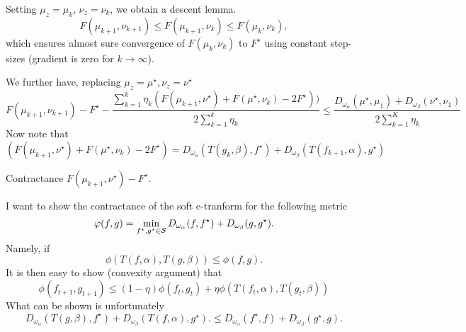 \documentclass[a4paper, 10pt]{article}
\begin{document}
Setting $\mu_z = \mu_{k}$, $\nu_z = \nu_k$, we obtain a descent lemma.
\begin{equation}
    F(\mu_{k+1}, \nu_{k+1}) \leq F(\mu_{k+1}, \nu_{k}) \leq F(\mu_{k}, \nu_{k}),
\end{equation}
which ensures almost sure convergence of $F(\mu_k, \nu_k)$ to $F^\star$ using constant step-sizes (gradient is zero for $k \to \infty$).

We further have, replacing $\mu_z = \mu^\star, \nu_z = \nu^\star$
%
\begin{equation}
    F(\mu_{k+1}, \nu_{k+1}) - F^\star
    - \frac{
        \sum_{k=1}^k \eta_k (F(\mu_{k+1}, \nu^\star)
    +F(\mu^\star, \nu_k) - 2 F^\star))
    }
    {2 \sum_{k=1}^k \eta_k}
    \leq \frac{
    D_{\omega_\alpha}(\mu^\star, \mu_1)
    + D_{\omega_\beta}(\nu^\star, \nu_1)
    }{2 \sum_{k=1}^K \eta_k}
\end{equation}
Now note that
\begin{equation}
    (F(\mu_{k+1}, \nu^\star)
    +F(\mu^\star, \nu_k) - 2 F^\star) =
     D_{\omega_\alpha}(T(g_k, \beta), f^\star)
     + D_{\omega_\beta}(T(f_{k+1}, \alpha), g^\star)
\end{equation}

Contractance $F(\mu_{k+1}, \nu^\star) - F^\star$.

I want to show the contractance of the soft c-tranform for the following metric
\begin{equation}
    \varphi(f, g) = \min_{f^\star, g^\star \in \mathcal{S}} 
    D_{\omega_\alpha}(f, f^\star)
    +
    D_{\omega_\beta}(g, g^\star).
\end{equation}
Namely, if 
\begin{equation}
    \phi(T(f,\alpha), T(g,\beta))
    \leq \phi(f, g).
\end{equation}
It is then easy to show (convexity argument) that
\begin{equation}
    \phi(f_{t+1}, g_{t+1}) \leq
    (1-\eta) 
    \phi(f_t, g_t)
    + \eta \phi(T(f_t,\alpha), T(g_t,\beta))
\end{equation}
What can be shown is unfortunately
\begin{equation}
    D_{\omega_\alpha}(T(g,\beta), f^\star) +
    D_{\omega_\beta}(T(f,\alpha), g^\star). \leq
    D_{\omega_\alpha}(f^\star, f)
    +
    D_{\omega_\beta}(g^\star, g).
\end{equation}
\printbibliography
\end{document}
